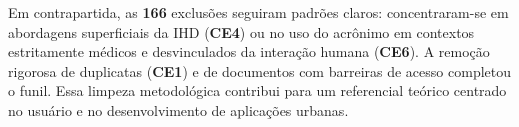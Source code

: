 \documentclass[12pt]{article}
\begin{document}
Em contrapartida, as \textbf{166} exclusões seguiram padrões claros: concentraram-se em abordagens superficiais da IHD (\textbf{CE4}) ou no uso do acrônimo em contextos estritamente médicos e desvinculados da interação humana (\textbf{CE6}). A remoção rigorosa de duplicatas (\textbf{CE1}) e de documentos com barreiras de acesso completou o funil. Essa limpeza metodológica contribui para um referencial teórico centrado no usuário e no desenvolvimento de aplicações urbanas.




\end{document}
